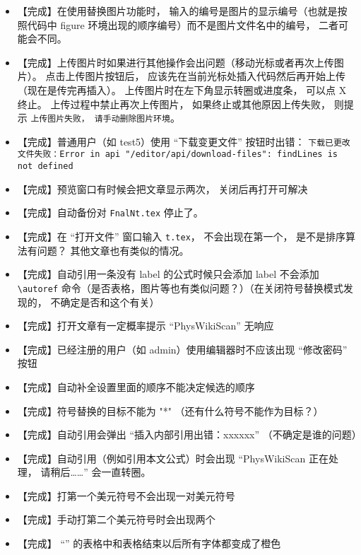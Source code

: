 \begin{itemize}
\item 【完成】在使用替换图片功能时， 输入的编号是图片的显示编号（也就是按照代码中 figure 环境出现的顺序编号）而不是图片文件名中的编号， 二者可能会不同。

\item 【完成】上传图片时如果进行其他操作会出问题（移动光标或者再次上传图片）。 点击上传图片按钮后， 应该先在当前光标处插入代码然后再开始上传（现在是传完再插入）。 上传图片时在左下角显示转圈或进度条， 可以点 X 终止。 上传过程中禁止再次上传图片， 如果终止或其他原因上传失败， 则提示 \verb`上传图片失败， 请手动删除图片环境`。

\item 【完成】普通用户（如 test5）使用 “下载变更文件” 按钮时出错： \verb`下载已更改文件失败：Error in api "/editor/api/download-files": findLines is not defined`

\item 【完成】预览窗口有时候会把文章显示两次， 关闭后再打开可解决

\item 【完成】自动备份对 \verb`FnalNt.tex` 停止了。

\item 【完成】在 “打开文件” 窗口输入 \lstinline|t.tex|， 不会出现在第一个， 是不是排序算法有问题？ 其他文章也有类似的情况。

\item 【完成】自动引用一条没有 label 的公式时候只会添加 label 不会添加 \lstinline|\autoref| 命令（是否表格，图片等也有类似问题？）（在关闭符号替换模式发现的， 不确定是否和这个有关）

\item 【完成】打开文章有一定概率提示 “PhysWikiScan” 无响应

\item 【完成】已经注册的用户（如 admin）使用编辑器时不应该出现 “修改密码” 按钮

\item 【完成】自动补全设置里面的顺序不能决定候选的顺序

\item 【完成】符号替换的目标不能为 "*" （还有什么符号不能作为目标？）

\item 【完成】自动引用会弹出 “插入内部引用出错：xxxxxx” （不确定是谁的问题）

\item 【完成】自动引用（例如引用本文公式）时会出现 “PhysWikiScan 正在处理， 请稍后……” 会一直转圈。

\item 【完成】打第一个美元符号不会出现一对美元符号

\item 【完成】手动打第二个美元符号时会出现两个

\item 【完成】 “” 的表格中和表格结束以后所有字体都变成了橙色
\end{itemize}

